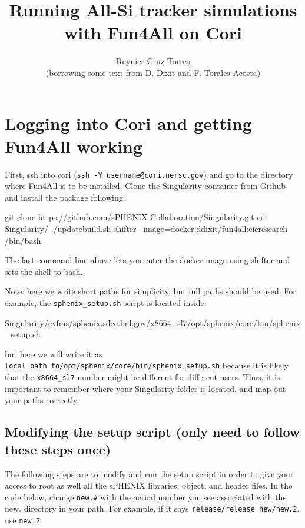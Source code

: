 \documentclass[12pt]{article}
\title{Running All-Si tracker simulations with Fun4All on Cori}
\author{Reynier Cruz Torres \\ (borrowing some text from D. Dixit and F. Torales-Acosta)}
\begin{document}
\maketitle

\tableofcontents

\newpage
\section{Logging into Cori and getting Fun4All working}

First, ssh into cori (\verb|ssh -Y username@cori.nersc.gov|) and go to the directory where Fun4All is to be installed.
Clone the Singularity container from Github and install the package following:

\begin{tcolorbox}
\begin{verbnobox}[\scriptsize]
git clone https://github.com/sPHENIX-Collaboration/Singularity.git
cd Singularity/
./updatebuild.sh
shifter --image=docker:ddixit/fun4all:eicresearch /bin/bash
\end{verbnobox}  
\end{tcolorbox}

The last command line above lets you enter the docker image using shifter and sets the shell to bash.

Note: here we write short paths for simplicity, but full paths should be used.
For example, the \verb|sphenix_setup.sh| script is located inside:

\begin{tcolorbox}
\begin{verbnobox}[\scriptsize]
Singularity/cvfms/sphenix.sdcc.bnl.gov/x8664_sl7/opt/sphenix/core/bin/sphenix_setup.sh
\end{verbnobox}  
\end{tcolorbox}

but here we will write it as \verb|local_path_to/opt/sphenix/core/bin/sphenix_setup.sh| because it is likely that the \verb|x8664_sl7| number might be different for different users.
Thus, it is important to remember where your Singularity folder is located, and map out your paths correctly.

\subsection{Modifying the setup script (only need to follow these steps once)}
The following steps are to modify and run the setup script in order to give your access to root as well all the sPHENIX libraries, object, and header files.
In the code below, change \verb|new.#| with the actual number you see associated with the new. directory in your path. For example, if it says \verb|release/release_new/new.2|, use \verb|new.2|
\end{document}
